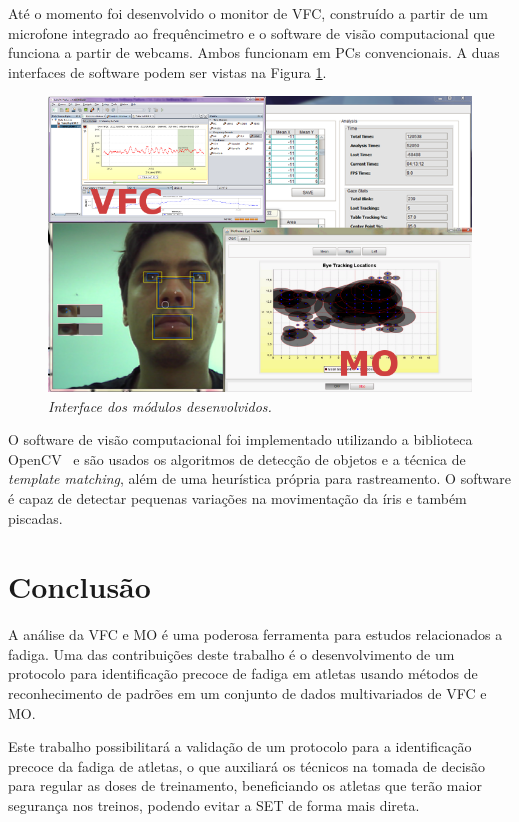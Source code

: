 \documentclass[10pt, conference, compsocconf]{IEEEtran}
\begin{document}
	Até o momento foi desenvolvido o monitor de VFC, construído a partir de um microfone integrado ao frequêncimetro e o software de visão computacional que funciona a partir de webcams. Ambos funcionam em PCs convencionais. A duas interfaces de software podem ser vistas na Figura \ref{fig:softvfc}.
	
	 \begin{figure}[htb]
   \centering  
   \includegraphics[scale=.5]{img/mot}
   \caption{\it Interface dos módulos desenvolvidos. }
   \label{fig:softvfc}
\end{figure}

 	O software de visão computacional foi implementado utilizando a biblioteca OpenCV~\cite{Bradski2008} e são usados os algoritmos de detecção de objetos e a técnica de \textit{template matching}, além de uma heurística própria para rastreamento. O software é capaz de detectar pequenas variações na movimentação da íris e também piscadas.
 	 
\section{Conclusão}

	A análise da VFC e MO é uma poderosa ferramenta para estudos relacionados a fadiga. Uma das contribuições deste trabalho é o desenvolvimento de um protocolo para identificação precoce de fadiga em atletas usando métodos de reconhecimento de padrões em um conjunto de dados multivariados de VFC e MO.  
	
	Este trabalho possibilitará a validação de um protocolo para a identificação precoce da fadiga de atletas, o que auxiliará os técnicos na tomada de decisão para regular as doses de treinamento, beneficiando os atletas que terão maior segurança nos treinos, podendo evitar a SET de forma mais direta. 
  

 
 
\end{document}
